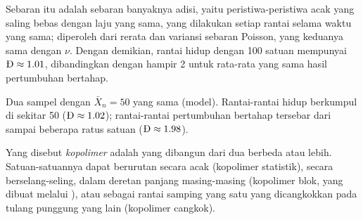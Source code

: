 \admitted

Sebaran itu adalah sebaran banyaknya adisi, yaitu peristiwa-peristiwa acak
yang saling bebas dengan laju yang sama, yang dilakukan setiap rantai
selama waktu yang sama;  diperoleh dari rerata dan variansi
sebaran Poisson, yang keduanya sama dengan $\nu$. Dengan demikian, rantai
hidup dengan 100 satuan mempunyai $\text{\DH} \approx 1.01$, dibandingkan
dengan hampir 2 untuk rata-rata yang sama hasil pertumbuhan bertahap.

\begin{omfigure}

{\small Dua sampel dengan $\bar X_n = 50$ yang sama (model). Rantai-rantai
hidup berkumpul di sekitar 50 ($\text{\DH}
\approx 1.02$); rantai-rantai pertumbuhan bertahap tersebar dari 
sampai beberapa ratus satuan ($\text{\DH} \approx
1.98$).}
\end{omfigure}

\begin{definition}[Kopolimer]\label{def:b2:polymer-synthesis:copolymer}
Yang disebut \emph{kopolimer} adalah  yang dibangun
dari dua  berbeda atau lebih. Satuan-satuannya dapat berurutan secara
acak (kopolimer statistik), secara berselang-seling, dalam deretan panjang
masing-masing (kopolimer blok, yang dibuat melalui ), atau
sebagai rantai samping  yang satu yang dicangkokkan pada tulang
punggung  yang lain (kopolimer cangkok).
\end{definition}

